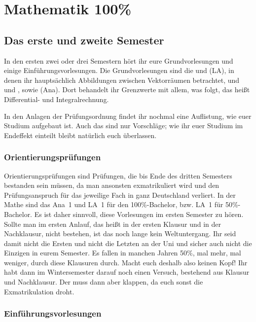 \section{Mathematik 100\%}

\subsection{Das erste und zweite Semester}

In den ersten zwei oder drei Semestern hört ihr eure Grundvorlesungen und einige Einführungsvorlesungen. Die Grundvorlesungen sind die  und  (\gls{LA}), in denen ihr hauptsächlich Abbildungen zwischen Vektorräumen betrachtet, und  und , sowie  (\gls{Ana}). Dort behandelt ihr Grenzwerte mit allem, was folgt, das heißt Differential- und Integralrechnung.

In den Anlagen der Prüfungsordnung findet ihr nochmal eine Auflistung, wie euer Studium aufgebaut ist. Auch das sind nur Vorschläge; wie ihr euer Studium im Endeffekt einteilt bleibt natürlich euch überlassen.

\subsubsection{Orientierungsprüfungen}

Orientierungsprüfungen sind Prüfungen, die bis Ende des dritten Semesters bestanden sein müssen, da man ansonsten exmatrikuliert wird und den Prüfungsanspruch für das jeweilige Fach in ganz Deutschland verliert. In der Mathe sind das \gls{Ana}~1 und \gls{LA}~1 für den 100\%-Bachelor, bzw. \gls{LA}~1 für 50\%-Bachelor. Es ist daher sinnvoll, diese Vorlesungen im ersten Semester zu hören. Sollte man im ersten Anlauf, das heißt in der ersten Klausur und in der Nachklausur, nicht bestehen, ist das noch lange kein Weltuntergang. Ihr seid damit nicht die Ersten und nicht die Letzten an der Uni und sicher auch nicht die Einzigen in eurem Semester. Es fallen in manchen Jahren 50\%, mal mehr, mal weniger, durch diese Klausuren durch. Macht euch deshalb also keinen Kopf! Ihr habt dann im Wintersemester darauf noch einen Versuch, bestehend aus Klausur und Nachklausur. Der muss dann aber klappen, da euch sonst die Exmatrikulation droht.

\subsubsection{Einführungsvorlesungen}

